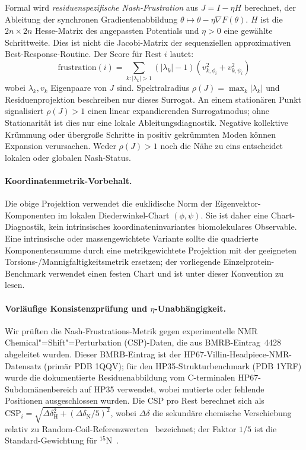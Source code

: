 \documentclass[12pt,a4paper]{article}
\theoremstyle{remark}
\begin{document}
Formal wird \emph{residuenspezifische Nash-Frustration} aus $J=I-\eta H$ berechnet, der Ableitung der synchronen Gradientenabbildung $\theta\mapsto\theta-\eta\nabla F(\theta)$. $H$ ist die $2n\times2n$ Hesse-Matrix des angepassten Potentials und $\eta>0$ eine gewählte Schrittweite. Dies ist nicht die Jacobi-Matrix der sequenziellen approximativen Best-Response-Routine. Der Score für Rest $i$ lautet:
\begin{equation}
\text{frustration}(i) = \sum_{k: |\lambda_k| > 1} (|\lambda_k| - 1) \left( v_{k,\phi_i}^2 + v_{k,\psi_i}^2 \right)
\end{equation}
wobei $\lambda_k,v_k$ Eigenpaare von $J$ sind. Spektralradius $\rho(J)=\max_k|\lambda_k|$ und Residuenprojektion beschreiben nur dieses Surrogat. An einem stationären Punkt signalisiert $\rho(J)>1$ einen linear expandierenden Surrogatmodus; ohne Stationarität ist dies nur eine lokale Ableitungsdiagnostik. Negative kollektive Krümmung oder übergroße Schritte in positiv gekrümmten Moden können Expansion verursachen. Weder $\rho(J)>1$ noch die Nähe zu eins entscheidet lokalen oder globalen Nash-Status.

\paragraph{Koordinatenmetrik-Vorbehalt.}
Die obige Projektion verwendet die euklidische Norm der Eigenvektor-Komponenten im lokalen Diederwinkel-Chart $(\phi,\psi)$. Sie ist daher eine Chart-Diagnostik, kein intrinsisches koordinateninvariantes biomolekulares Observable. Eine intrinsische oder massengewichtete Variante sollte die quadrierte Komponentensumme durch eine metrikgewichtete Projektion mit der geeigneten Torsions-/Mannigfaltigkeitsmetrik ersetzen; der vorliegende Einzelprotein-Benchmark verwendet einen festen Chart und ist unter dieser Konvention zu lesen.

\paragraph{Vorläufige Konsistenzprüfung und $\eta$-Unabhängigkeit.}
Wir prüften die Nash-Frustrations-Metrik gegen experimentelle NMR Chemical"=Shift"=Perturbation (CSP)-Daten, die aus BMRB-Eintrag~4428~\cite{BMRB4428} abgeleitet wurden. Dieser BMRB-Eintrag ist der HP67-Villin-Headpiece-NMR-Datensatz (primär PDB 1QQV); für den HP35-Strukturbenchmark (PDB 1YRF) wurde die dokumentierte Residuenabbildung vom C-terminalen HP67-Subdomänenbereich auf HP35 verwendet, wobei mutierte oder fehlende Positionen ausgeschlossen wurden. Die CSP pro Rest berechnet sich als $\text{CSP}_i = \sqrt{\Delta\delta_{\text{H}}^2 + (\Delta\delta_{\text{N}}/5)^2}$, wobei $\Delta\delta$ die sekundäre chemische Verschiebung relativ zu Random-Coil-Referenzwerten~\cite{Wishart1995} bezeichnet; der Faktor $1/5$ ist die Standard-Gewichtung für ${}^{15}$N~\cite{Williamson2013}.
\end{document}
